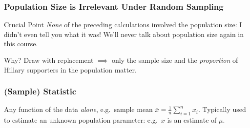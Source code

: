 \begin{frame}
  \frametitle{Population Size is Irrelevant Under Random Sampling}

  \begin{block}{Crucial Point}
    \emph{None} of the preceding calculations involved the population size: I didn't even tell you what it was!
    We'll never talk about population size again in this course.
  \end{block}

  \begin{block}{Why?}
    Draw with replacement $\implies$ only the sample size and the \emph{proportion} of Hillary supporters in the population matter.
  \end{block}

\end{frame}
\begin{frame}
  \frametitle{(Sample) Statistic}

  Any function of the data \emph{alone}, e.g.\ sample mean $\bar{x} = \frac{1}{n}\sum_{i=1}^n x_i$. Typically used to estimate an unknown population parameter: e.g.\ $\bar{x}$ is an estimate of $\mu$.

\end{frame}

